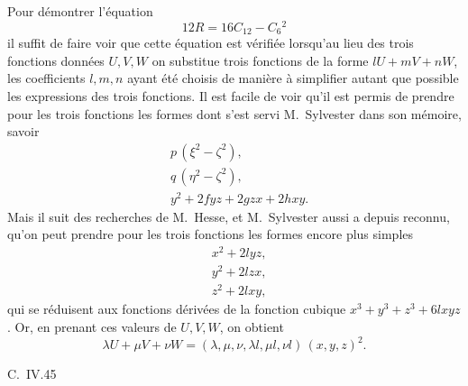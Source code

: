 \documentclass[11pt]{article}
\begin{document}
\noindent Pour d\'emontrer l'\'equation
\[
   12 R = 16 C_{12} - C_6{}^2
\]
il suffit de faire voir que cette \'equation est v\'erifi\'ee lorsqu'au lieu des trois fonctions donn\'ees $U, V, W$ on substitue trois fonctions de la forme $l U + m V + n W$, les coefficients $l, m, n$ ayant \'et\'e choisis de mani\`ere \`a simplifier autant que possible les expressions des trois fonctions. Il est facile de voir qu'il est permis de prendre pour les trois fonctions les formes dont s'est servi M.~Sylvester dans son m\'emoire, savoir
\[
\begin{aligned}
   &p\,(\xi^2 - \zeta^2),\\
   &q\,(\eta^2 - \zeta^2),\\
   &y^2 + 2 f y z + 2 g z x + 2 h x y.
\end{aligned}
\]
Mais il suit des recherches de M.~Hesse, et M.~Sylvester aussi a depuis reconnu, qu'on peut prendre pour les trois fonctions les formes encore plus simples
\[
\begin{aligned}
   &x^2 + 2 l y z,\\
   &y^2 + 2 l z x,\\
   &z^2 + 2 l x y,
\end{aligned}
\]
qui se r\'eduisent aux fonctions d\'eriv\'ees de la fonction cubique $x^3 + y^3 + z^3 + 6 l x y z$. Or, en prenant ces valeurs de $U, V, W$, on obtient
\[
   \lambda U + \mu V + \nu W = (\lambda, \mu, \nu, \lambda l, \mu l, \nu l)\,(x, y, z)^2.
\]

\hfill C.~IV.\hfill 45

\end{document}
